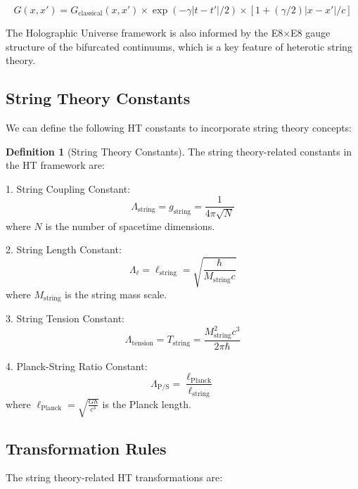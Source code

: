 \documentclass{article}
\theoremstyle{plain}
\theoremstyle{definition}
\newtheorem{definition}[theorem]{Definition}
\theoremstyle{remark}
\begin{document}
\begin{equation}
G(x,x') = G_\text{classical}(x,x') \times \exp(-\gamma|t-t'|/2) \times \left[1 + (\gamma/2)|x-x'|/c\right]
\end{equation}

The Holographic Universe framework is also informed by the E8×E8 gauge structure of the bifurcated continuums, which is a key feature of heterotic string theory.

\subsection{String Theory Constants}

We can define the following HT constants to incorporate string theory concepts:

\begin{definition}[String Theory Constants]
The string theory-related constants in the HT framework are:

1. String Coupling Constant:
   \begin{equation}
   \Lambda_\text{string} = g_\text{string} = \frac{1}{4\pi \sqrt{N}}
   \end{equation}
   where $N$ is the number of spacetime dimensions.

2. String Length Constant:
   \begin{equation}
   \Lambda_\ell = \ell_\text{string} = \sqrt{\frac{\hbar}{M_\text{string}c}}
   \end{equation}
   where $M_\text{string}$ is the string mass scale.

3. String Tension Constant:
   \begin{equation}
   \Lambda_\text{tension} = T_\text{string} = \frac{M_\text{string}^2c^3}{2\pi\hbar}
   \end{equation}

4. Planck-String Ratio Constant:
   \begin{equation}
   \Lambda_\text{P/S} = \frac{\ell_\text{Planck}}{\ell_\text{string}}
   \end{equation}
   where $\ell_\text{Planck} = \sqrt{\frac{G\hbar}{c^3}}$ is the Planck length.
\end{definition}

\subsection{Transformation Rules}

The string theory-related HT transformations are:
\end{document}
